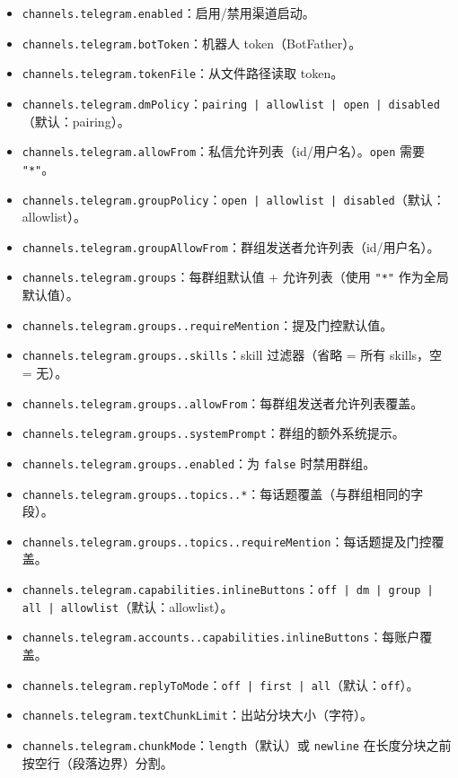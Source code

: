 \begin{itemize}
  \item \texttt{channels.telegram.enabled}：启用/禁用渠道启动。
  \item \texttt{channels.telegram.botToken}：机器人 token（BotFather）。
  \item \texttt{channels.telegram.tokenFile}：从文件路径读取 token。
  \item \texttt{channels.telegram.dmPolicy}：\texttt{pairing | allowlist | open | disabled}（默认：pairing）。
  \item \texttt{channels.telegram.allowFrom}：私信允许列表（id/用户名）。\texttt{open} 需要 \texttt{"*"}。
  \item \texttt{channels.telegram.groupPolicy}：\texttt{open | allowlist | disabled}（默认：allowlist）。
  \item \texttt{channels.telegram.groupAllowFrom}：群组发送者允许列表（id/用户名）。
  \item \texttt{channels.telegram.groups}：每群组默认值 + 允许列表（使用 \texttt{"*"} 作为全局默认值）。
  \item \texttt{channels.telegram.groups..requireMention}：提及门控默认值。
  \item \texttt{channels.telegram.groups..skills}：skill 过滤器（省略 = 所有 skills，空 = 无）。
  \item \texttt{channels.telegram.groups..allowFrom}：每群组发送者允许列表覆盖。
  \item \texttt{channels.telegram.groups..systemPrompt}：群组的额外系统提示。
  \item \texttt{channels.telegram.groups..enabled}：为 \texttt{false} 时禁用群组。
  \item \texttt{channels.telegram.groups..topics..*}：每话题覆盖（与群组相同的字段）。
  \item \texttt{channels.telegram.groups..topics..requireMention}：每话题提及门控覆盖。
  \item \texttt{channels.telegram.capabilities.inlineButtons}：\texttt{off | dm | group | all | allowlist}（默认：allowlist）。
  \item \texttt{channels.telegram.accounts..capabilities.inlineButtons}：每账户覆盖。
  \item \texttt{channels.telegram.replyToMode}：\texttt{off | first | all}（默认：\texttt{off}）。
  \item \texttt{channels.telegram.textChunkLimit}：出站分块大小（字符）。
  \item \texttt{channels.telegram.chunkMode}：\texttt{length}（默认）或 \texttt{newline} 在长度分块之前按空行（段落边界）分割。

\end{itemize}
